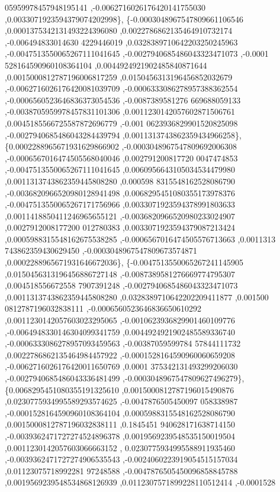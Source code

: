 \begin{DoxyCode}
      05959978457948195141 ,-0.0062716026176420141755030 ,0.0033071923594379074202998\},
\{-0.0003048967547809661106546 ,0.0001375342131493224396080 ,0.0022786862135464910732174 ,-0.006494833014630
      4229446019 ,0.0328389710642203250245963 ,-0.0047513550065267111041645 ,-0.0027940685486043323471073 ,-0.0001
      528164590960108364104 ,0.0044924921902485840871644 ,0.0015000812787196006817259 ,0.0150456313196456852032679
       ,-0.0062716026176420081039709 ,-0.0006333086278957388362554 ,-0.0006560523646836373054536 ,-0.0087389581276
      669688059133 ,-0.0038705959978457831101306 ,0.0011230142057602871506761 ,0.0045185566725587872696779 ,-0.001
      0623936829901520825098 ,-0.0027940685486043284439794 ,0.0011313743862359434966258\},
\{0.0002288965671931629866902 ,-0.0003048967547809692006308 ,-0.0006567016474505568040046 ,0.002791200817720
      0047474853 ,-0.0047513550065267111041645 ,0.0060956643105034534479980 ,0.0011313743862359445808280 ,0.000598
      8315548162528086790 ,-0.0036820966520980128941498 ,0.0068295451080355173978376 ,-0.0047513550065267171756966
       ,0.0033071923594378991803633 ,0.0011418850411246965655121 ,-0.0036820966520980233024907 ,0.0027912008177200
      012780383 ,0.0033071923594379087213424 ,0.0005988315548162675538285 ,-0.0006567016474505576713663 ,0.0011313
      743862359430629450 ,-0.0003048967547809673574871 ,0.0002288965671931646672036\},
\{-0.0047513550065267241145905 ,0.0150456313196456886727148 ,-0.0087389581276669774795307 ,0.004518556672558
      7907391248 ,-0.0027940685486043323471073 ,0.0011313743862359445808280 ,0.0328389710642202209411877 ,0.001500
      0812787196032838111 ,-0.0006560523646836650610292 ,0.0011230142057603023295065 ,-0.0010623936829901460109776
       ,-0.0064948330146304099341759 ,0.0044924921902485589336740 ,-0.0006333086278957093459563 ,-0.00387059599784
      57844111732 ,0.0022786862135464984457922 ,-0.0001528164590960060659208 ,-0.0062716026176420011650769 ,0.0001
      375342131493299206030 ,-0.0027940685486043336481499 ,-0.0003048967547809627496279\},
\{0.0068295451080355191325610 ,0.0015000812787196015490876 ,0.0230775934995589293574625 ,-0.0047876505450097
      058338987 ,-0.0001528164590960108364104 ,0.0005988315548162528086790 ,0.0015000812787196032838111 ,0.1845451
      940628171638714150 ,-0.0039362471727274524896378 ,0.0019569239548535150019504 ,0.0011230142057603066663152 ,
      0.0230775934995588911935460 ,-0.0039362471727274906535543 ,-0.0024060223919054515157034 ,0.01123075718992281
      97248588 ,-0.0047876505450096858845788 ,0.0019569239548534868126939 ,0.0112307571899228110512414 ,-0.0001528

\end{DoxyCode}
